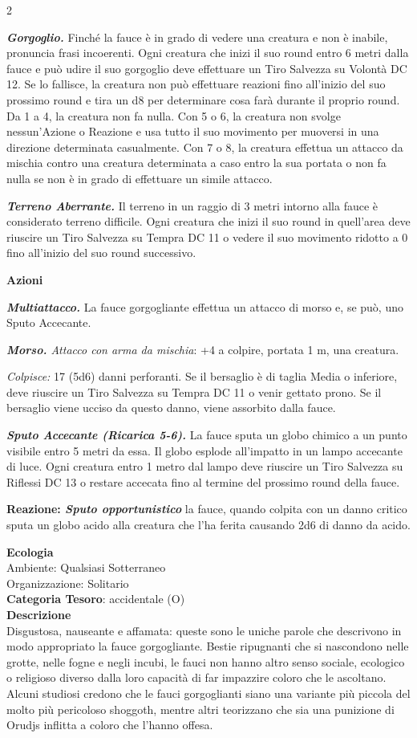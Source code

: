 \begin{multicols}{2}
{\emph{\textbf{Gorgoglio.}} Finché la fauce è in grado di vedere una creatura e non è inabile, pronuncia frasi incoerenti. Ogni creatura che inizi il suo round entro 6 metri dalla fauce e può udire il suo gorgoglio deve effettuare un Tiro Salvezza su Volontà DC 12. Se lo fallisce, la creatura non può effettuare reazioni fino all'inizio del suo prossimo round e tira un d8 per determinare cosa farà durante il proprio round. Da 1 a 4, la creatura non fa nulla. Con 5 o 6, la creatura non svolge nessun'Azione o Reazione e usa tutto il suo movimento per muoversi in una direzione determinata casualmente. Con 7 o 8, la creatura effettua un attacco da mischia contro una creatura determinata a caso entro la sua portata o non fa nulla se non è in grado di effettuare un simile attacco.

\emph{\textbf{Terreno Aberrante.}} Il terreno in un raggio di 3 metri intorno alla fauce è considerato terreno difficile. Ogni creatura che inizi il suo round in quell'area deve riuscire un Tiro Salvezza su Tempra DC 11 o vedere il suo movimento ridotto a 0 fino all'inizio del suo round successivo.

\textbf{Azioni}

\emph{\textbf{Multiattacco.}} La fauce gorgogliante effettua un attacco di morso e, se può, uno Sputo Accecante.

\emph{\textbf{Morso.} Attacco con arma da mischia}: +4 a colpire, portata 1 m, una creatura.

\emph{Colpisce:} 17 (5d6) danni perforanti. Se il bersaglio è di taglia Media o inferiore, deve riuscire un Tiro Salvezza su Tempra DC 11 o venir gettato prono. Se il bersaglio viene ucciso da questo danno, viene assorbito dalla fauce.

\emph{\textbf{Sputo Accecante (Ricarica 5-6).}} La fauce sputa un globo chimico a un punto visibile entro 5 metri da essa. Il globo esplode all'impatto in un lampo accecante di luce. Ogni creatura entro 1 metro dal lampo deve riuscire un Tiro Salvezza su Riflessi DC 13 o restare accecata fino al termine del prossimo round della fauce.

\textbf{Reazione: \emph{Sputo opportunistico}} la fauce, quando colpita con un danno critico sputa un globo acido alla creatura che l'ha ferita causando 2d6 di danno da acido.

\textbf{Ecologia}\\
Ambiente: Qualsiasi Sotterraneo\\
Organizzazione: Solitario\\
\textbf{Categoria Tesoro}: accidentale (O)\\
\textbf{Descrizione}\\
Disgustosa, nauseante e affamata: queste sono le uniche parole che descrivono in modo appropriato la fauce gorgogliante. Bestie ripugnanti che si nascondono nelle grotte, nelle fogne e negli incubi, le fauci non hanno altro senso sociale, ecologico o religioso diverso dalla loro capacità di far impazzire coloro che le ascoltano. Alcuni studiosi credono che le fauci gorgoglianti siano una variante più piccola del molto più pericoloso shoggoth, mentre altri teorizzano che sia una punizione di Orudjs inflitta a coloro che l'hanno offesa.

}
\end{multicols}
